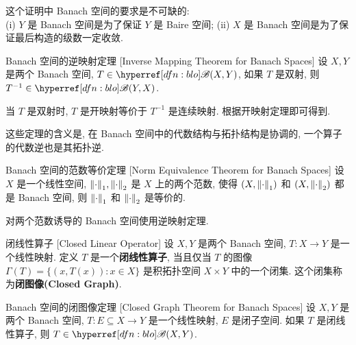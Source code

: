         \begin{rmk}
            [Dedicatia]
            这个证明中 Banach 空间的要求是不可缺的: \\
            (i) \(Y\) 是 Banach 空间是为了保证 \(Y\) 是 Baire 空间;
            (ii) \(X\) 是 Banach 空间是为了保证最后构造的级数一定收敛.
        \end{rmk}

        \begin{thm}
            [imt]
            {Banach 空间的逆映射定理}
            [Inverse Mapping Theorem for Banach Spaces] 
            设 \(X,Y\) 是两个 Banach 空间, \(T\in\blo(X,Y)\), 如果 \(T\) 是双射, 则 \(T^{-1}\in\blo(Y,X)\).
        \end{thm}

        \begin{prf}
            当 \(T\) 是双射时, \(T\) 是开映射等价于 \(T^{-1}\) 是连续映射. 根据开映射定理即可得到.
        \end{prf}

        \begin{rmk}
            [Dedicatia]
            这些定理的含义是, 在 Banach 空间中的代数结构与拓扑结构是协调的, 一个算子的代数逆也是其拓扑逆. 
        \end{rmk}

        \begin{thm}
            {Banach 空间的范数等价定理}
            [Norm Equivalence Theorem for Banach Spaces]
            设 \(X\) 是一个线性空间, \(\norm{\cdot}_1, \norm{\cdot}_2\) 是 \(X\) 上的两个范数, 使得 \((X,\norm{\cdot}_1)\) 和 \((X,\norm{\cdot}_2)\) 都是 Banach 空间, 则 \(\norm{\cdot}_1\) 和 \(\norm{\cdot}_2\) 是等价的.
        \end{thm}

        \begin{prf}
            对两个范数诱导的 Banach 空间使用逆映射定理.
        \end{prf}

        \begin{dfn}
            {闭线性算子}
            [Closed Linear Operator]
            设 \(X,Y\) 是两个 Banach 空间, \(T:X\to Y\) 是一个线性映射. 定义 \(T\) 是一个\textbf{闭线性算子}, 当且仅当 \(T\) 的图像 \(\Gamma(T)=\{(x,T(x)):x\in X\}\) 是积拓扑空间 \(X\times Y\) 中的一个闭集. 这个闭集称为\textbf{闭图像(Closed Graph)}.
        \end{dfn}

        \begin{thm}
            [cgt]
            {Banach 空间的闭图像定理}
            [Closed Graph Theorem for Banach Spaces]
            设 \(X,Y\) 是两个 Banach 空间, \(T:E\subseteq X\to Y\) 是一个线性映射, \(E\) 是闭子空间. 如果 \(T\) 是闭线性算子, 则 \(T\in\blo(X,Y)\).
        \end{thm}


